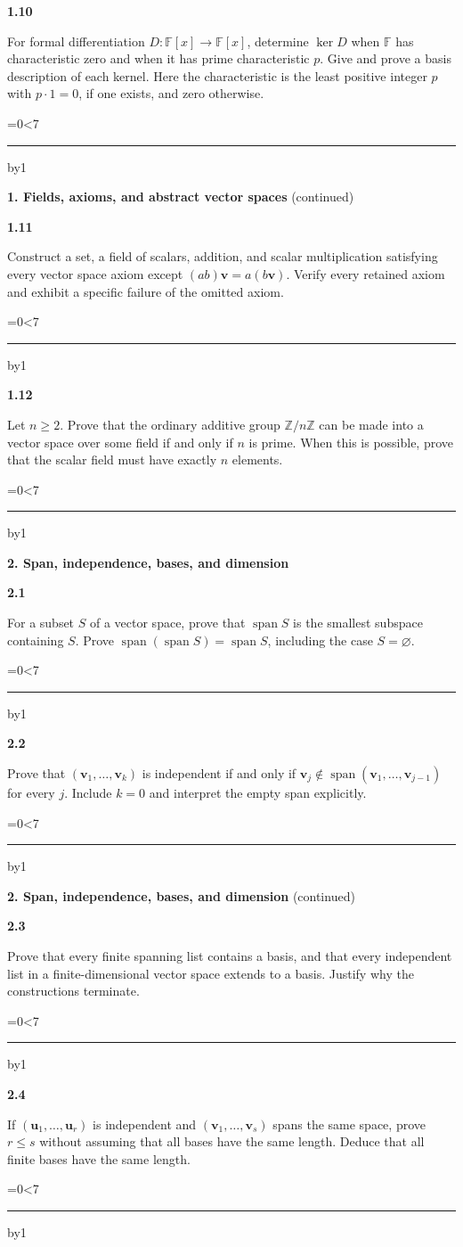 \documentclass[11pt,letterpaper]{article}
\newcommand{\topicshort}{Problem collection}
\newcommand{\F}{\mathbb F}\newcommand{\R}{\mathbb R}\newcommand{\Q}{\mathbb Q}\newcommand{\C}{\mathbb C}\newcommand{\Z}{\mathbb Z}
\newcommand{\spn}{\operatorname{span}}\newcommand{\rk}{\operatorname{rank}}\newcommand{\tr}{\operatorname{tr}}\newcommand{\id}{\operatorname{id}}\newcommand{\rref}{\operatorname{rref}}
\newcommand{\ruled}[1]{\par\begingroup\parskip=0pt\baselineskip=17pt\count255=0\loop\ifnum\count255<#1\noindent\textcolor{black!17}{\rule{\linewidth}{.25pt}}\par\advance\count255 by1\repeat\endgroup}
\newcommand{\problem}[4]{\noindent\begin{minipage}[t][3.48in][t]{\linewidth}\textbf{\color{navy}#1}\quad{\small\sffamily\color{teal}#2#3}\par #4\par\vfill\ruled{7}\end{minipage}}
\begin{document}
\problem{1.10}{M}{}{For formal differentiation $D:\F[x]\to\F[x]$, determine $\ker D$ when $\F$ has characteristic zero and when it has prime characteristic $p$. Give and prove a basis description of each kernel. Here the characteristic is the least positive integer $p$ with $p\cdot1=0$, if one exists, and zero otherwise.}
\newpage
\renewcommand{\topicshort}{Axioms and abstraction}
{\large\bfseries\color{navy}1. Fields, axioms, and abstract vector spaces} {\small(continued)}\par\vspace{9pt}
\problem{1.11}{C}{}{Construct a set, a field of scalars, addition, and scalar multiplication satisfying every vector space axiom except $(ab)\mathbf v=a(b\mathbf v)$. Verify every retained axiom and exhibit a specific failure of the omitted axiom.}
\par\vspace{14pt}
\problem{1.12}{C}{}{Let $n\ge2$. Prove that the ordinary additive group $\Z/n\Z$ can be made into a vector space over some field if and only if $n$ is prime. When this is possible, prove that the scalar field must have exactly $n$ elements.}
\newpage
\renewcommand{\topicshort}{Lists and bases}
{\large\bfseries\color{navy}2. Span, independence, bases, and dimension}\par\vspace{9pt}
\problem{2.1}{W}{ / $\star$}{For a subset $S$ of a vector space, prove that $\spn S$ is the smallest subspace containing $S$. Prove $\spn(\spn S)=\spn S$, including the case $S=\varnothing$.}
\par\vspace{14pt}
\problem{2.2}{W}{ / $\star$}{Prove that $(\mathbf v_1,\ldots,\mathbf v_k)$ is independent if and only if $\mathbf v_j\notin\spn(\mathbf v_1,\ldots,\mathbf v_{j-1})$ for every $j$. Include $k=0$ and interpret the empty span explicitly.}
\newpage
\renewcommand{\topicshort}{Lists and bases}
{\large\bfseries\color{navy}2. Span, independence, bases, and dimension} {\small(continued)}\par\vspace{9pt}
\problem{2.3}{M}{ / $\star$}{Prove that every finite spanning list contains a basis, and that every independent list in a finite-dimensional vector space extends to a basis. Justify why the constructions terminate.}
\par\vspace{14pt}
\problem{2.4}{M}{ / $\star$}{If $(\mathbf u_1,\ldots,\mathbf u_r)$ is independent and $(\mathbf v_1,\ldots,\mathbf v_s)$ spans the same space, prove $r\le s$ without assuming that all bases have the same length. Deduce that all finite bases have the same length.}
\end{document}
